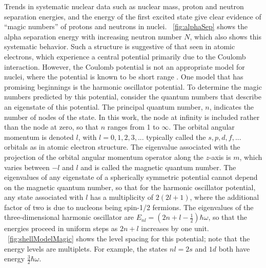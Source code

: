 Trends in systematic nuclear data such as nuclear mass, proton and neutron separation energies, and the energy of the first excited state give clear evidence of ``magic numbers'' of protons and neutrons in nuclei.  {\fig}~\ref{fig:alphaSep} shows the alpha separation energy with increasing neutron number $N$, which also shows this systematic behavior.  Such a structure is suggestive of that seen in atomic electrons, which experience a central potential primarily due to the Coulomb interaction.  However, the Coulomb potential is not an appropriate model for nuclei, where the potential is known to be short range \citep{Casten}.  One model that has promising beginnings is the harmonic oscillator potential.  To determine the magic numbers predicted by this potential, consider the quantum numbers that describe an eigenstate of this potential.  The principal quantum number, $n$, indicates the number of nodes of the state.  In this work, the node at infinity is included rather than the node at zero, so that $n$ ranges from 1 to $\infty$.  The orbital angular momentum is denoted $l$, with $l = 0, 1, 2, 3, ...$ typically called the $s, p, d, f, ...$ orbitals as in atomic electron structure.  The eigenvalue associated with the projection of the orbital angular momentum operator along the $z$-axis is $m$, which varies between $-l$ and $l$ and is called the magnetic quantum number.  The eigenvalues of any eigenstate of a spherically symmetric potential cannot depend on the magnetic quantum number, so that for the harmonic oscillator potential, any state associated with $l$ has a multiplicity of $2(2l+1)$, where the additional factor of two is due to nucleons being spin-1/2 fermions.  The eigenvalues of the three-dimensional harmonic oscillator are $E_{nl} = (2n+l-\frac{1}{2})\hbar\omega$, so that the energies proceed in uniform steps as $2n+l$ increases by one unit.  {\fig}~\ref{fig:shellModelMagic} shows the level spacing for this potential; note that the energy levels are multiplets.  For example, the states $nl = 2s$ and $1d$ both have energy $\frac{3}{2}\hbar\omega$.  

